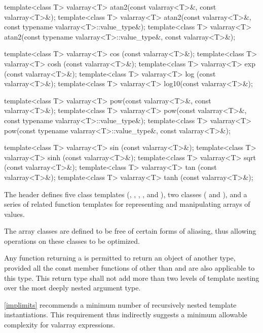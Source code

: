 \begin{codeblock}
{  template<class T> valarray<T> atan2(const valarray<T>&, const valarray<T>&);
  template<class T> valarray<T> atan2(const valarray<T>&,
                                      const typename valarray<T>::value_type&);
  template<class T> valarray<T> atan2(const typename valarray<T>::value_type&,
                                      const valarray<T>&);

  template<class T> valarray<T> cos  (const valarray<T>&);
  template<class T> valarray<T> cosh (const valarray<T>&);
  template<class T> valarray<T> exp  (const valarray<T>&);
  template<class T> valarray<T> log  (const valarray<T>&);
  template<class T> valarray<T> log10(const valarray<T>&);

  template<class T> valarray<T> pow(const valarray<T>&, const valarray<T>&);
  template<class T> valarray<T> pow(const valarray<T>&, const typename valarray<T>::value_type&);
  template<class T> valarray<T> pow(const typename valarray<T>::value_type&, const valarray<T>&);

  template<class T> valarray<T> sin  (const valarray<T>&);
  template<class T> valarray<T> sinh (const valarray<T>&);
  template<class T> valarray<T> sqrt (const valarray<T>&);
  template<class T> valarray<T> tan  (const valarray<T>&);
  template<class T> valarray<T> tanh (const valarray<T>&);
}
\end{codeblock}

\pnum
The header  defines five class templates
(,
,
,
,
and
),
two classes (
and
),
and a series of related
function templates
for representing
and manipulating arrays of values.

\pnum
The
array classes
are defined to be free of certain forms of aliasing, thus allowing
operations on these classes to be optimized.

\pnum
Any function returning a
is permitted to return an object of another type, provided all the
const member functions of
other than  and 
are also applicable to this type.
This return type shall not add
more than two levels of template nesting over the most deeply nested
argument type.
\begin{footnote}
\ref{implimits} recommends a minimum number
of recursively nested template
instantiations.
This requirement thus indirectly suggests a minimum
allowable complexity for valarray expressions.
\end{footnote}

